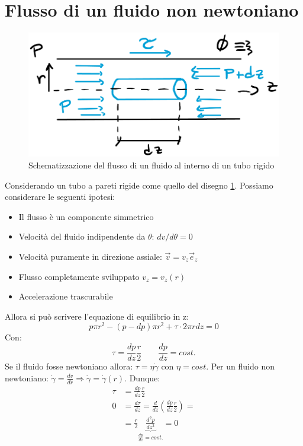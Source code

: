 \section{Flusso di un fluido non newtoniano}
\begin{figure}
\centering
\includegraphics[width = \textwidth]{gfx/FlussoTubo}
\caption{Schematizzazione del flusso di un fluido al interno di un tubo rigido}
\label{fig:FlussoTubo}
\end{figure}
Considerando un tubo a pareti rigide come quello del disegno \ref{fig:FlussoTubo}.
Possiamo considerare le seguenti ipotesi:
\begin{itemize}
\item Il flusso è un componente simmetrico
\item Velocità del fluido indipendente da $\theta$: $dv/d\theta = 0$
\item Velocità puramente in direzione assiale: $\vec{v} = v_z \vec{e}_z$
\item Flusso completamente sviluppato $v_z = v_z(r)$
\item Accelerazione trascurabile
\end{itemize}
Allora si può scrivere l'equazione di equilibrio in z:
\begin{equation}
p \pi r^2 - (p - dp)\pi r^2 + \tau \cdot 2\pi r dz = 0
\end{equation}
Con:
\begin{equation}
\tau = \frac{dp}{dz}\frac{r}{2} \qquad \frac{dp}{dz}= cost.
\end{equation}
Se il fluido fosse newtoniano allora: $\tau = \eta \dot{\gamma}$ con $\eta = cost.$
Per un fluido non newtoniano: $\dot{\gamma} = \frac{dv}{dr} \Rightarrow \dot{\gamma}=\dot{\gamma}(r)$.
Dunque:
\begin{equation}
\begin{split}
\tau &= \frac{dp}{dz} \frac{r}{2}\\
0 &= \frac{d\tau}{dz} = \frac{d}{dz}\left(\frac{dp}{dz}\frac{r}{2}\right) =\\
&= \frac{r}{2}\underbrace{\frac{d^2p}{dz^2}}_{\frac{dp}{dz} = cost.} = 0 
\end{split} 
\end{equation}
